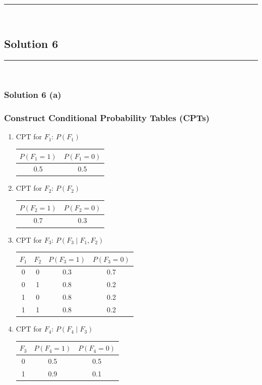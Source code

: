 \documentclass{article}
\begin{document}
\noindent\rule{\textwidth}{0.4pt}\\

\newpage

\subsection*{Solution 6}
\noindent\rule{\textwidth}{0.4pt}\\
\subsubsection*{Solution 6 (a)}
\subsubsection*{Construct Conditional Probability Tables (CPTs)}
\begin{enumerate}
    \item CPT for $F_1$: $P(F_1)$
    \begin{center}
    \begin{tabular}{c c}
    \toprule
    $P(F_1=1)$ & $P(F_1=0)$ \\
    \midrule
    0.5 & 0.5 \\
    \bottomrule
    \end{tabular}
    \end{center}
    \item CPT for $F_2$: $P(F_2)$
    \begin{center}
    \begin{tabular}{c c}
    \toprule
    $P(F_2=1)$ & $P(F_2=0)$ \\
    \midrule
    0.7 & 0.3 \\
    \bottomrule
    \end{tabular}
    \end{center}
    \item CPT for $F_3$: $P(F_3 \mid F_1, F_2)$
    \begin{center}
    \begin{tabular}{c c | c c}
    \toprule
    $F_1$ & $F_2$ & $P(F_3=1)$ & $P(F_3=0)$ \\
    \midrule
    0 & 0 & 0.3 & 0.7 \\
    0 & 1 & 0.8 & 0.2 \\
    1 & 0 & 0.8 & 0.2 \\
    1 & 1 & 0.8 & 0.2 \\
    \bottomrule
    \end{tabular}
    \end{center}
    \item CPT for $F_4$: $P(F_4 \mid F_3)$
    \begin{center}
    \begin{tabular}{c | c c}
    \toprule
    $F_3$ & $P(F_4=1)$ & $P(F_4=0)$ \\
    \midrule
    0 & 0.5 & 0.5 \\
    1 & 0.9 & 0.1 \\
    \bottomrule
    \end{tabular}
    \end{center}
\end{enumerate}
\end{document}

